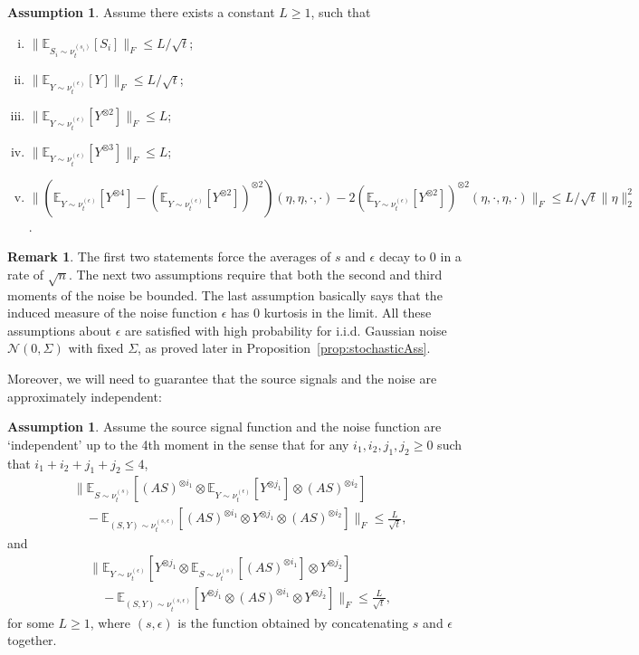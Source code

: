 \documentclass[jmlr]{article}
\newcommand{\E}{\mathbb{E}}
\newcommand{\iid}{i.i.d.\xspace}
\theoremstyle{definition}
\newtheorem{remark}[lemma]{Remark}
\newtheorem{assumption}[lemma]{Assumption}
\begin{document}
\begin{assumption}
\label{ass:gauss}
Assume there exists a constant $L\ge 1$, such that 
\begin{enumerate}[(i)]
\vspace{-3mm}
\item $\| \E_{S_i\sim \nu_t^{(s_i)}} [S_i] \|_F\le L/\sqrt{t}$;
\item $\| \E_{Y \sim \nu_t^{(\epsilon)}} [Y] \|_F \le L/\sqrt{t}$;
\item $\| \E_{Y\sim \nu_t^{(\epsilon)}} [Y^{\otimes 2}] \|_F \le L$;
\item $\| \E_{Y\sim \nu_t^{(\epsilon)}} [Y^{\otimes 3}] \|_F \le L$;
\item $\| \left(\E_{Y\sim \nu_t^{(\epsilon)}} [Y^{\otimes4}] - (\E_{Y\sim \nu_t^{(\epsilon)}} [Y^{\otimes2}])^{\otimes 2}\right)(\eta,\eta,\cdot,\cdot)  - 2 (\E_{Y\sim \nu_t^{(\epsilon)}} [Y^{\otimes2}])^{\otimes 2}(\eta,\cdot,\eta,\cdot)\|_F\le L/\sqrt{t}\|\eta\|_2^2$.
\end{enumerate}
\end{assumption}
\begin{remark}
The first two statements force the averages of $s$ and $\epsilon$ decay to 0 in a rate of $\sqrt{n}$.
The next two assumptions require that both the second and third moments of the noise be bounded.
The last assumption basically says that the induced measure of the noise function $\epsilon$ has 0 kurtosis in the limit.
All these assumptions about $\epsilon$ are satisfied with high probability for \iid Gaussian noise $\mathcal{N}(0,\Sigma)$ with fixed $\Sigma$, as proved later in Proposition~\ref{prop:stochasticAss}.
\end{remark}
Moreover, we will need to guarantee that the source signals and the noise are approximately independent:
\begin{assumption}
\label{ass:independence}
Assume the source signal function and the noise function are `independent' up to the 4th moment in the sense that for any $i_1,i_2,j_1,j_2 \ge 0$ such that $i_1+i_2+j_1+j_2 \le 4$,  
\begin{align*}
& \| \E_{S\sim \nu_t^{(s)}} [(AS)^{\otimes i_1}\otimes \E_{Y\sim \nu_t^{(\epsilon)}} [Y^{\otimes j_1}] \otimes (AS)^{\otimes i_2}]\\
& \quad - \E_{(S, Y)\sim \nu_t^{(s, \epsilon)}} [(AS)^{\otimes i_1}\otimes Y^{\otimes j_1}\otimes (AS)^{\otimes i_2}]  \|_F 
 \le\frac{L}{\sqrt{t}},
\end{align*}
and 
\begin{align*}
& \| \E_{Y\sim \nu_t^{(\epsilon)}} [Y^{\otimes j_1} \otimes \E_{S\sim \nu_t^{(s)}} [(AS)^{\otimes i_1}] \otimes Y^{\otimes j_2}] \\
& \quad - \E_{(S, Y)\sim \nu_t^{(s, \epsilon)}} [ Y^{\otimes j_1}\otimes (AS)^{\otimes i_1}\otimes Y^{\otimes j_2}] \|_F 
\le\frac{L}{\sqrt{t}}, %
\end{align*}
for some $L \ge 1$, where $(s,\epsilon)$ is the function obtained by concatenating $s$ and $\epsilon$ together.  
\end{assumption}
\end{document}
